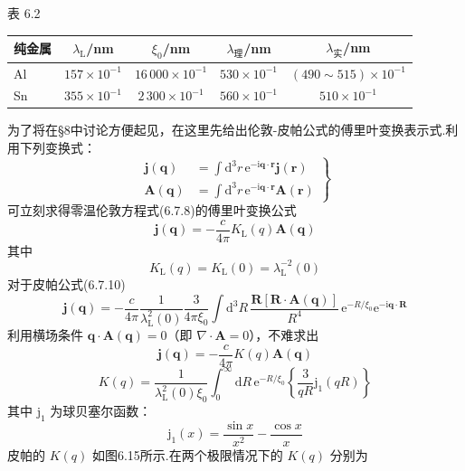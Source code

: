 \begin{center}
\begin{minipage}{10.5cm}\centering\small
表 6.2\\[0.5em]
\begin{tabular}{lcccc}
\hline
纯金属 & $\lambda_{\mathrm{L}}$/nm & $\xi_{0}$/nm & $\lambda_{\text{理}}$/nm & $\lambda_{\text{实}}$/nm\\
\hline
Al & $157\times10^{-1}$ & $16\,000\times10^{-1}$ & $530\times10^{-1}$ & $(490\sim515)\times10^{-1}$\\
Sn & $355\times10^{-1}$ & $2\,300\times10^{-1}$ & $560\times10^{-1}$ & $510\times10^{-1}$\\
\hline
\end{tabular}
\end{minipage}
\end{center}

为了将在§8中讨论方便起见，在这里先给出伦敦-皮帕公式的傅里叶变换表示式.利用下列变换式：
\begin{equation}
  \left.
  \begin{aligned}
    \boldsymbol{j}(\boldsymbol{q})
    &=\int\mathrm{d}^{3}r\,\mathrm{e}^{-\mathrm{i}\boldsymbol{q}\cdot\boldsymbol{r}}
    \boldsymbol{j}(\boldsymbol{r})\\
    \boldsymbol{A}(\boldsymbol{q})
    &=\int\mathrm{d}^{3}r\,\mathrm{e}^{-\mathrm{i}\boldsymbol{q}\cdot\boldsymbol{r}}
    \boldsymbol{A}(\boldsymbol{r})
  \end{aligned}\right\}
\end{equation}
可立刻求得零温伦敦方程式(6.7.8)的傅里叶变换公式
\begin{equation}
  \boldsymbol{j}(\boldsymbol{q})
  =-\frac{c}{4\pi}K_{\mathrm{L}}(q)\boldsymbol{A}(\boldsymbol{q})
\end{equation}
其中
\begin{equation}
  K_{\mathrm{L}}(q)=K_{\mathrm{L}}(0)=\lambda_{\mathrm{L}}^{-2}(0)
\end{equation}
对于皮帕公式(6.7.10)
\begin{equation}
  \boldsymbol{j}(\boldsymbol{q})=-\frac{c}{4\pi}\frac{1}{\lambda_{\mathrm{L}}^{2}(0)}
  \frac{3}{4\pi\xi_{0}}\int\mathrm{d}^{3}R\,
  \frac{\boldsymbol{R}\left[\boldsymbol{R}\cdot\boldsymbol{A}(\boldsymbol{q})\right]}{R^{4}}\,
  \mathrm{e}^{-R/\xi_{0}}\mathrm{e}^{-\mathrm{i}\boldsymbol{q}\cdot\boldsymbol{R}}
\end{equation}
利用横场条件 $\boldsymbol{q}\cdot\boldsymbol{A}(\boldsymbol{q})=0$（即 $\nabla\cdot\boldsymbol{A}=0$），不难求出
\begin{equation}
  \boldsymbol{j}(\boldsymbol{q})
  =-\frac{c}{4\pi}K(q)\boldsymbol{A}(\boldsymbol{q})
\end{equation}
\begin{equation}
  K(q)=\frac{1}{\lambda_{\mathrm{L}}^{2}(0)\xi_{0}}
  \int_{0}^{\infty}\mathrm{d}R\,\mathrm{e}^{-R/\xi_{0}}
  \left\{\frac{3}{qR}\mathrm{j}_{1}(qR)\right\}
\end{equation}
其中 $\mathrm{j}_{1}$ 为球贝塞尔函数：
\begin{equation}
  \mathrm{j}_{1}(x)=\frac{\sin x}{x^{2}}-\frac{\cos x}{x}
\end{equation}
皮帕的 $K(q)$ 如图6.15所示.在两个极限情况下的 $K(q)$ 分别为

